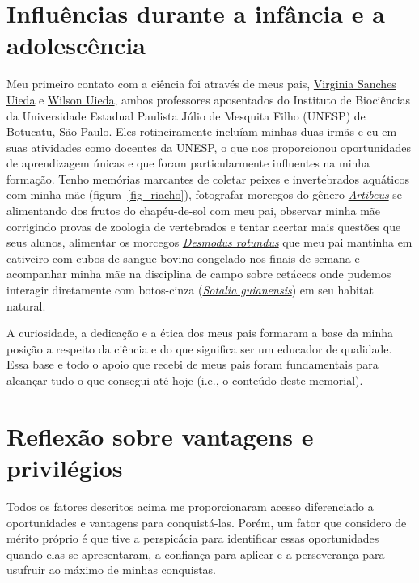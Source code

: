 \documentclass[10pt,a4paper,oneside]{book}
\begin{document}
\section{Influências durante a infância e a adolescência}

Meu primeiro contato com a ciência foi através de meus pais,
\href{https://orcid.org/0000-0002-6078-1342}{Virginia Sanches Uieda} e
\href{https://orcid.org/0000-0002-4177-3339}{Wilson Uieda},
ambos professores aposentados do Instituto de Biociências da Universidade
Estadual Paulista Júlio de Mesquita Filho (UNESP) de Botucatu, São Paulo.
Eles rotineiramente incluíam minhas duas irmãs e eu em suas atividades como
docentes da UNESP, o que nos proporcionou oportunidades de aprendizagem únicas
e que foram particularmente influentes na minha formação.
Tenho memórias marcantes de coletar peixes e invertebrados aquáticos com minha
mãe (figura~\ref{fig_riacho}), fotografar morcegos do gênero
\href{https://pt.wikipedia.org/wiki/Artibeus}{\textit{Artibeus}} se alimentando
dos frutos do chapéu-de-sol com meu pai, observar minha mãe corrigindo provas
de zoologia de vertebrados e tentar acertar mais questões que seus alunos,
alimentar os morcegos
\href{https://pt.wikipedia.org/wiki/Desmodus_rotundus}{\textit{Desmodus rotundus}}
que meu pai mantinha em cativeiro com cubos de sangue bovino congelado nos
finais de semana e acompanhar minha mãe na disciplina de campo sobre cetáceos
onde pudemos interagir diretamente com botos-cinza
(\href{https://pt.wikipedia.org/wiki/Sotalia_guianensis}{\textit{Sotalia guianensis}})
em seu habitat natural.

A curiosidade, a dedicação e a ética dos meus pais formaram a base da minha
posição a respeito da ciência e do que significa ser um educador de qualidade.
Essa base e todo o apoio que recebi de meus pais foram fundamentais para
alcançar tudo o que consegui até hoje (i.e., o conteúdo deste memorial).

\section{Reflexão sobre vantagens e privilégios}

Todos os fatores descritos acima me proporcionaram acesso diferenciado a
oportunidades e vantagens para conquistá-las.
Porém, um fator que considero de mérito próprio é que tive a perspicácia para
identificar essas oportunidades quando elas se apresentaram, a confiança para
aplicar e a perseverança para usufruir ao máximo de minhas conquistas.
\end{document}

